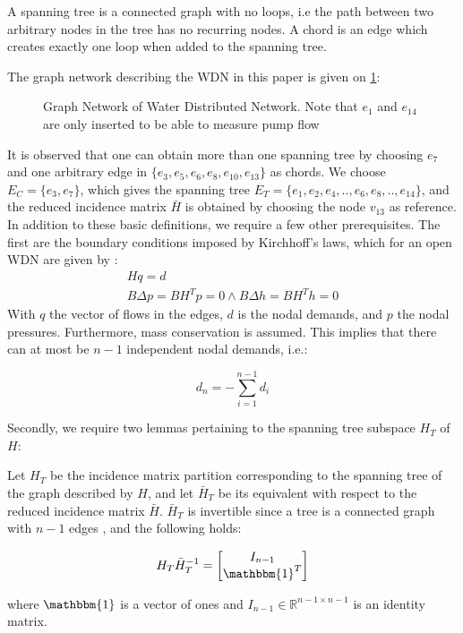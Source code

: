 A spanning tree is a connected graph with no loops, i.e the path between two arbitrary nodes in the tree has no recurring nodes. A chord is an edge which creates exactly one loop when added to the spanning tree. 

The graph network describing the WDN in this paper is given on \cref{fig:tikzWDNGraph}:

\begin{figure}[h!]
	\centering
	\resizebox{\columnwidth}{!}{
		}
	\caption{Graph Network of Water Distributed Network. Note that $e_1$ and $e_{14} $ are only inserted to be able to measure pump flow}
	\label{fig:tikzWDNGraph}
\end{figure}
It is observed that one can obtain more than one spanning tree by choosing $ e_7 $ and one arbitrary edge in $ \{e_3,e_5,e_6,e_8,e_{10},e_{13}\} $ as chords. We choose 
$E_C=\{e_3,e_7\}$, which gives the spanning tree 
$E_T=\{e_1,e_2,e_4,..,e_6,e_8,..,e_{14}\}$, and the reduced incidence matrix $\bar{H}$ is obtained by choosing the node $ v_{13} $ as reference.\\

In addition to these basic definitions, we require a few other prerequisites. The first are the boundary conditions imposed by Kirchhoff's laws, which for an open WDN are given by \cite{Jensen}:
\begin{gather}
	Hq = d \label{eq:KirchNodeLaw} \\
	B\Delta p = B H^T p = 0 \wedge B\Delta h = B H^T h = 0 \label{eq:KirchMeshLaw}
\end{gather} 
With $ q $ the vector of flows in the edges, $ d $ is the nodal demands, and $p$ the nodal pressures. Furthermore, mass conservation is assumed. This implies that there can at most be $n-1$ independent nodal demands, i.e.:

\begin{equation}\label{eq:MassConservation}
	d_n = -\sum_{i=1}^{n-1}d_i
\end{equation}

Secondly, we require two lemmas pertaining to the spanning tree subspace $H_T$ of $H$: \\

\begin{lem}\label{lem:TreePartitionLemma}
	Let $H_T$ be the incidence matrix partition corresponding to the spanning tree of the graph described by $H$, and let $\bar{H}_T$ be its equivalent with respect to the reduced incidence matrix $\bar{H}$. $\bar{H}_T$ is invertible since a tree is a connected graph with $n-1$ edges \cite{Deo}, and the following holds:
	
	\begin{equation}\label{eq:TreePartitionLemma}
		H_T\bar{H}_T^{-1} = \begin{bmatrix} I_{n-1} \\ \mathbbm{1}^T	\end{bmatrix}
	\end{equation}
	
	where $\mathbbm{1}$ is a vector of ones and $I_{n-1} \in \mathbb{R}^{n-1 \times n-1}$ is an identity matrix.
\end{lem}

